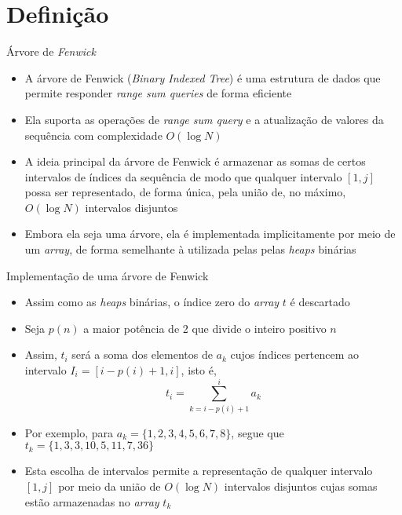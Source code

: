 \section{Definição}

\begin{frame}[fragile]{Árvore de \textit{Fenwick}} 

    \begin{itemize}
        \item A árvore de Fenwick (\textit{Binary Indexed Tree}) é uma estrutura de dados que
            permite responder \textit{range sum queries} de forma eficiente

        \item Ela suporta as operações de \textit{range sum query} e a atualização de valores da
            sequência com complexidade $O(\log N)$

        \item A ideia principal da árvore de Fenwick é armazenar as somas de certos intervalos
            de índices da sequência de modo que qualquer intervalo $[1, j]$
            possa ser representado, de forma única, pela união de, no máximo, $O(\log N)$ intervalos
            disjuntos

        \item Embora ela seja uma árvore, ela é implementada implicitamente por meio de um 
            \textit{array}, de forma semelhante à utilizada pelas pelas \textit{heaps} binárias
    \end{itemize}

\end{frame}

\begin{frame}[fragile]{Implementação de uma árvore de Fenwick}

    \begin{itemize}
        \item Assim como as \textit{heaps} binárias, o índice zero do  \textit{array}
            $t$ é descartado

        \item Seja $p(n)$ a maior potência de 2 que divide o inteiro positivo $n$

        \item Assim, $t_i$ será a soma dos elementos de $a_k$ cujos índices pertencem ao
            intervalo $I_i = [i - p(i) + 1, i]$, isto é,
        \[
            t_i = \sum_{k = i - p(i) + 1}^i a_k
        \]

        \item Por exemplo, para $a_k = \lbrace 1, 2, 3, 4, 5, 6, 7, 8\rbrace$, segue que
            $t_k = \lbrace 1, 3, 3, 10, 5, 11, 7, 36\rbrace$

        \item Esta escolha de intervalos permite a representação de qualquer intervalo $[1, j]$
            por meio da união de $O(\log N)$ intervalos disjuntos cujas somas estão armazenadas
            no \textit{array} $t_k$
    \end{itemize}

\end{frame}

